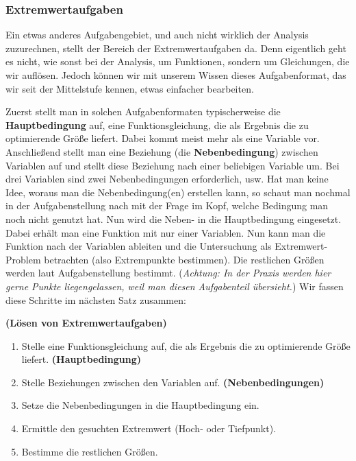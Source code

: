\documentclass[ngerman, 12pt]{nssheetxea}
\begin{document}
\subsubsection{Extremwertaufgaben}
Ein etwas anderes Aufgabengebiet, und auch nicht wirklich der Analysis zuzurechnen, stellt der Bereich der Extremwertaufgaben da. Denn eigentlich geht es nicht, wie sonst bei der Analysis, um Funktionen, sondern um Gleichungen, die wir auflösen. Jedoch können wir mit unserem Wissen dieses Aufgabenformat, das wir seit der Mittelstufe kennen, etwas einfacher bearbeiten. \par
Zuerst stellt man in solchen Aufgabenformaten typischerweise die \textbf{Hauptbedingung} auf, eine Funktionsgleichung, die als Ergebnis die zu optimierende Größe liefert. Dabei kommt meist mehr als eine Variable vor. Anschließend stellt man eine Beziehung (die \textbf{Nebenbedingung}) zwischen Variablen auf und stellt diese Beziehung nach einer beliebigen Variable um. Bei drei Variablen sind zwei Nebenbedingungen erforderlich, usw. Hat man keine Idee, woraus man die Nebenbedingung(en) erstellen kann, so schaut man nochmal in der Aufgabenstellung nach mit der Frage im Kopf, welche Bedingung man noch nicht genutzt hat. Nun wird die Neben- in die Hauptbedingung eingesetzt. Dabei erhält man eine Funktion mit nur einer Variablen. Nun kann man die Funktion nach der Variablen ableiten und die Untersuchung als Extremwert-Problem betrachten (also Extrempunkte bestimmen). Die restlichen Größen werden laut Aufgabenstellung bestimmt. (\textit{Achtung: In der Praxis werden hier gerne Punkte liegengelassen, weil man diesen Aufgabenteil übersieht.}) Wir fassen diese Schritte im nächsten Satz zusammen:
\begin{theorem}\textbf{(Lösen von Extremwertaufgaben)}
\begin{enumerate}
\item Stelle eine Funktionsgleichung auf, die als Ergebnis die zu optimierende Größe liefert. \textbf{(Hauptbedingung)}
\item Stelle Beziehungen zwischen den Variablen auf. \textbf{(Nebenbedingungen)}
\item Setze die Nebenbedingungen in die Hauptbedingung ein.
\item Ermittle den gesuchten Extremwert (Hoch- oder Tiefpunkt).
\item Bestimme die restlichen Größen.
\end{enumerate}
\label{Satz:Extremwertaufgaben}
\end{theorem}
\end{document}
